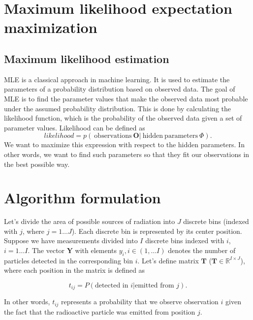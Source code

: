 {  \section{Maximum likelihood expectation maximization}



  \cite{1982_shepp_vardi_MLEM} \cite{EM} \cite{wilderman}

  \subsection{Maximum likelihood estimation}
  \ac{MLE} is a classical approach in machine learning.
  It is used to estimate the parameters of a probability distribution based on observed data. 
  The goal of \ac{MLE} is to find the parameter values that make the observed data most probable under the assumed probability distribution.
  This is done by calculating the likelihood function, which is the probability of the observed data given a set of parameter values.
  Likelihood can be defined as 
  \begin{equation}
    likelihood = p(\ \mathrm{observations } \  \boldsymbol{O} | \ \mathrm{hidden \ parameters\ } \Phi ).
    \label{eq:likelihood}
  \end{equation}
  We want to maximize this expression with respect to the hidden parameters.
  In other words, we want to find such parameters so that they fit our observations in the best possible way.

  \section{Algorithm formulation}
  Let's divide the area of possible sources of radiation into $J$ discrete bins (indexed with $j$, where $j = 1 \dotsc J$).
  Each discrete bin is represented by its center position.
  Suppose we have measurements divided into $I$ discrete bins indexed with $i$, $i = 1 \dotsc I$.
  The vector $\mathbf{Y}$ with elements $y_{i}, i \in (1, \dots I)$ denotes the number of particles detected in the corresponding bin $i$.
  Let's define matrix $\mathbf{T}$ ($\mathbf{T} \in \mathbb{R}^{I \times J}$), where each position in the matrix is defined as

  \begin{equation}
    t_{ij} =  P(\textrm{detected in } i | \textrm{emitted from } j).
  \end{equation}

  In other words, $t_{ij}$ represents a probability that we observe observation $i$ given the fact that the radioactive particle was emitted from position $j$.

}
